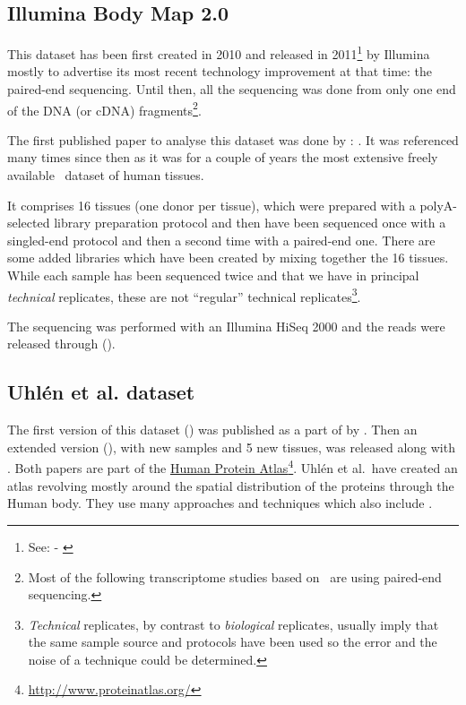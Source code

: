 \subsection{Illumina Body Map 2.0}
This dataset has been first created in 2010 and released in
2011\footnote{See:  - \cite{ibmEnsembl}} by Illumina
mostly to advertise its most recent technology improvement at that time:
the paired-end sequencing.
Until then, all the sequencing was done from only one end of the \gls{DNA} (or
\gls{cDNA}) fragments\footnote{Most of the following transcriptome
studies based on \Rnaseq\ are using paired-end sequencing.}.

The first published paper to analyse this dataset was done by
\citet{ibmrelatedpaper}: .
It was referenced many times since then as it was for a couple of years
the most extensive freely available \Rnaseq\ dataset of human tissues.

It comprises 16 tissues (one donor per tissue), which were prepared with a
polyA-selected library preparation protocol and then have been sequenced once
with a singled-end protocol and then a second time with a paired-end one. There
are some added libraries which have been created by mixing together the 16 tissues.
While each sample has been sequenced twice and that we have in principal
\emph{technical} replicates, these are not ``regular'' technical
replicates\footnote{\emph{Technical} replicates,
by contrast to \emph{biological} replicates,
usually imply that the same sample source and protocols have been used so the
error and the noise of a technique could be determined.}.

The sequencing was performed with an Illumina HiSeq 2000 and the reads were
released through  ().


\subsection{Uhlén et al. dataset}

The first version of this dataset () was published
as a part of  by \citet{Uhlen2014}. Then an extended
version (), with new samples and 5 new tissues,
was released along with  \citep{Uhlen2015}.
Both papers are part of the
\href{http://www.proteinatlas.org/}{Human Protein Atlas}\footnote{%
\href{http://www.proteinatlas.org/}{http://www.proteinatlas.org/}}.
Uhlén et al.\ have created
an atlas revolving mostly around the spatial distribution of the proteins through
the Human body. They use many approaches and techniques which also include \Rnaseq.

